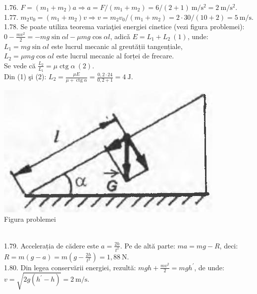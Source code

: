 1.76. $F=\left(m_{1}+m_{2}\right) a \Rightarrow a=F /\left(m_{1}+m_{2}\right)=6 /(2+1) \mathrm{~m} / \mathrm{s}^{2}=2 \mathrm{~m} / \mathrm{s}^{2}$.\\

1.77. $m_{2} v_{0}=\left(m_{1}+m_{2}\right) v \Rightarrow v=m_{2} v_{0} /\left(m_{1}+m_{2}\right)=2 \cdot 30 /(10+2)=5 \mathrm{~m} / \mathrm{s}$.\\

1.78. Se poate utiliza teorema variaţiei energiei cinetice (vezi figura problemei): $0-\frac{m v^{2}}{2}=-m g \sin \alpha l-\mu m g \cos \alpha l$, adicǎ $E=L_{1}+L_{2}\ (1)$, unde:\\ $L_{1}=m g \sin \alpha l$ este lucrul mecanic al greutății tangențiale,\\ $L_{2}=\mu m g \cos \alpha l$ este lucrul mecanic al forței de frecare.\\ Se vede că $\frac{L_{2}}{L_{1}}=\mu \operatorname{ctg} \alpha\ (2)$.\\ Din (1) şi (2): $L_{2}=\frac{\mu E}{\mu+\operatorname{ctg} \alpha}=\frac{0,2 \cdot 24}{0,2+1}=4 \mathrm{~J}$.\\ \begin{center} \includegraphics[width=0.4\linewidth]{images/2025_07_01_5b3ff9fa0d508c8e9f17g-213}\\ Figura problemei \end{center}\\

1.79. Accelerația de cădere este $a=\frac{2 h}{t^{2}}$. Pe de altă parte: $m a=m g-R$, deci:\\ $R=m(g-a)=m\left(g-\frac{2 h}{t^{2}}\right)=1,88 \mathrm{~N}$.\\

1.80. Din legea conservării energiei, rezultă: $m g h+\frac{m v^{2}}{2}=m g h^{\prime}$, de unde:\\ $v=\sqrt{2 g\left(h^{\prime}-h\right)}=2 \mathrm{~m} / \mathrm{s}$.\\

